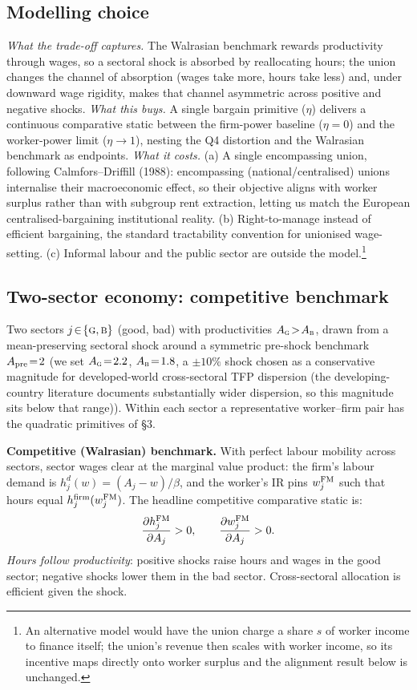 \documentclass[a4paper,11pt]{article}
\begin{document}
\subsection{Modelling choice}
\emph{What the trade-off captures.} The Walrasian benchmark rewards productivity through wages, so a sectoral shock is absorbed by reallocating hours; the union changes the channel of absorption (wages take more, hours take less) and, under downward wage rigidity, makes that channel asymmetric across positive and negative shocks. \emph{What this buys.} A single bargain primitive ($\eta$) delivers a continuous comparative static between the firm-power baseline ($\eta\!=\!0$) and the worker-power limit ($\eta\!\to\!1$), nesting the Q4 distortion and the Walrasian benchmark as endpoints. \emph{What it costs.} (a) A single encompassing union, following Calmfors--Driffill (1988): encompassing (national/centralised) unions internalise their macroeconomic effect, so their objective aligns with worker surplus rather than with subgroup rent extraction, letting us match the European centralised-bargaining institutional reality. (b) Right-to-manage instead of efficient bargaining, the standard tractability convention for unionised wage-setting. (c) Informal labour and the public sector are outside the model.\footnote{An alternative model would have the union charge a share $s$ of worker income to finance itself; the union's revenue then scales with worker income, so its incentive maps directly onto worker surplus and the alignment result below is unchanged.}

\subsection{Two-sector economy: competitive benchmark}
Two sectors $j\!\in\!\{\textsc{g},\textsc{b}\}$ (good, bad) with productivities $A_{\textsc{g}}\!>\!A_{\textsc{b}}$, drawn from a mean-preserving sectoral shock around a symmetric pre-shock benchmark $A_{\rm pre}\!=\!2$ (we set $A_{\textsc{g}}\!=\!2.2$, $A_{\textsc{b}}\!=\!1.8$, a $\pm 10\%$ shock chosen as a conservative magnitude for developed-world cross-sectoral TFP dispersion (the developing-country literature documents substantially wider dispersion, so this magnitude sits below that range)). Within each sector a representative worker--firm pair has the quadratic primitives of \S 3.

\textbf{Competitive (Walrasian) benchmark.} With perfect labour mobility across sectors, sector wages clear at the marginal value product: the firm's labour demand is $h_j^d(w)\!=\!(A_j-w)/\beta$, and the worker's IR pins $w_j^{\rm FM}$ such that hours equal $h^{\mathrm{firm}}_j(w_j^{\rm FM})$. The headline competitive comparative static is:
\[
\frac{\partial h_j^{\rm FM}}{\partial A_j} > 0,\qquad \frac{\partial w_j^{\rm FM}}{\partial A_j} > 0.
\]
\emph{Hours follow productivity}: positive shocks raise hours and wages in the good sector; negative shocks lower them in the bad sector. Cross-sectoral allocation is efficient given the shock.
\end{document}
